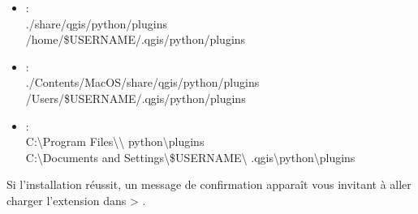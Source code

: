 \begin{itemize}[label=--]
\item {} :\\
./share/qgis/python/plugins \\
/home/\$USERNAME/.qgis/python/plugins
\item {} :\\
./Contents/MacOS/share/qgis/python/plugins \\
/Users/\$USERNAME/.qgis/python/plugins
\item {} :\\
C:\textbackslash Program Files\textbackslash \qg\textbackslash
python\textbackslash plugins \\
C:\textbackslash Documents and Settings\textbackslash\$USERNAME\textbackslash
.qgis\textbackslash python\textbackslash plugins
\end{itemize}

Si l'installation réussit, un message de confirmation apparaît vous invitant à aller charger l'extension dans  > .

